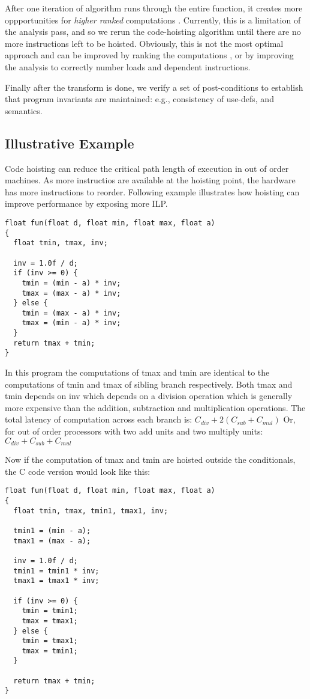 \documentclass{sig-alternate}
\begin{document}
After one iteration of algorithm runs through the entire function, it creates
more oppportunities for \emph{higher ranked} computations
\cite{rosen1988global}. Currently, this is a limitation of the \GVN{} analysis
pass, and so we rerun the code-hoisting algorithm until there are no more
instructions left to be hoisted.  Obviously, this is not the most optimal
approach and can be improved by ranking the computations \cite{rosen1988global},
or by improving the \GVN{} analysis to correctly number loads and dependent
instructions.

Finally after the transform is done, we verify a set of post-conditions to
establish that program invariants are maintained: e.g., consistency of
use-defs, and \SSA{} semantics.

\newpage

\subsection{Illustrative Example} \label{subsec:example}
Code hoisting can reduce the critical path length of execution in out of
order machines. As more instructios are available at the hoisting point, the
hardware has more instructions to reorder. Following example illustrates how
hoisting can improve performance by exposing more ILP.

\begin{verbatim}
float fun(float d, float min, float max, float a)
{
  float tmin, tmax, inv;

  inv = 1.0f / d;
  if (inv >= 0) {
    tmin = (min - a) * inv;
    tmax = (max - a) * inv;
  } else {
    tmin = (max - a) * inv;
    tmax = (min - a) * inv;
  }
  return tmax + tmin;
}
\end{verbatim}

In this program the computations of tmax and tmin are identical to the
computations of tmin and tmax of sibling branch respectively. Both tmax and tmin
depends on inv which depends on a division operation which is generally more
expensive than the addition, subtraction and multiplication operations. The
total latency of computation across each branch is:
$C_{div} + 2(C_{sub} + C_{mul})$
Or, for out of order processors with two add units and two multiply units:
$C_{div} + C_{sub} + C_{mul}$

Now if the computation of tmax and tmin are hoisted outside the
conditionals, the C code version would look like this:
\begin{verbatim}
float fun(float d, float min, float max, float a)
{
  float tmin, tmax, tmin1, tmax1, inv;

  tmin1 = (min - a);
  tmax1 = (max - a);

  inv = 1.0f / d;
  tmin1 = tmin1 * inv;
  tmax1 = tmax1 * inv;

  if (inv >= 0) {
    tmin = tmin1;
    tmax = tmax1;
  } else {
    tmin = tmax1;
    tmax = tmin1;
  }

  return tmax + tmin;
}

\end{verbatim}
\end{document}
